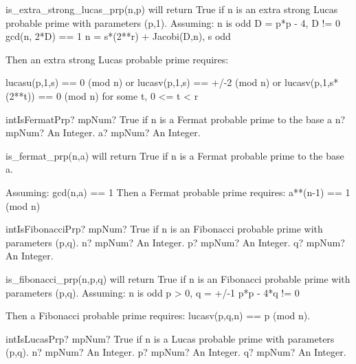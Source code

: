 is\_extra\_strong\_lucas\_prp(n,p) will return True if n is an extra strong Lucas probable prime
with parameters (p,1).
Assuming:
n is odd
D = p*p - 4, D != 0
gcd(n, 2*D) == 1
n = s*(2**r) + Jacobi(D,n), s odd

Then an extra strong Lucas probable prime requires:

lucasu(p,1,s) == 0 (mod n)
or
lucasv(p,1,s) == +/-2 (mod n)
or
lucasv(p,1,s*(2**t)) == 0 (mod n) for some t, 0 <= t < r




\vspace{0.6cm}
\begin{mpFunctionsExtract}
	\mpFunctionTwo
	{intIsFermatPrp? mpNum? True if n is a Fermat probable prime to the base a}
	{n? mpNum? An Integer.}
	{a? mpNum? An Integer.}
\end{mpFunctionsExtract}

\vspace{0.3cm}

is\_fermat\_prp(n,a) will return True if n is a Fermat probable prime to the base a.

Assuming:
gcd(n,a) == 1
Then a Fermat probable prime requires:
a**(n-1) == 1 (mod n)






\vspace{0.6cm}
\begin{mpFunctionsExtract}
	\mpFunctionThree
	{intIsFibonacciPrp? mpNum? True if n is an Fibonacci probable prime with parameters (p,q).}
	{n? mpNum? An Integer.}
	{p? mpNum? An Integer.}
	{q? mpNum? An Integer.}
\end{mpFunctionsExtract}

\vspace{0.3cm}

is\_fibonacci\_prp(n,p,q) will return True if n is an Fibonacci probable prime with parameters
(p,q).
Assuming:
n is odd
p > 0, q = +/-1
p*p - 4*q != 0

Then a Fibonacci probable prime requires:
lucasv(p,q,n) == p (mod n).





\vspace{0.6cm}
\begin{mpFunctionsExtract}
	\mpFunctionThree
	{intIsLucasPrp? mpNum? True if n is a Lucas probable prime with parameters (p,q).}
	{n? mpNum? An Integer.}
	{p? mpNum? An Integer.}
	{q? mpNum? An Integer.}
\end{mpFunctionsExtract}

